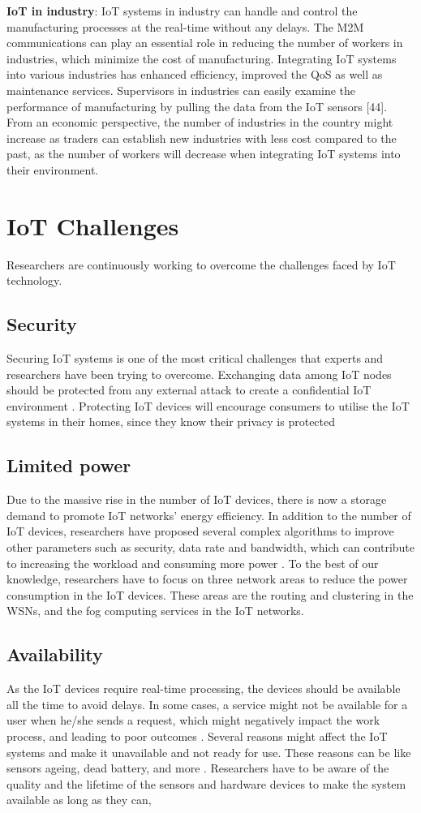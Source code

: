 \documentclass[pmlr,twocolumn,10pt]{jmlr} %
\begin{document}
\textbf{IoT in industry}: IoT systems in industry can handle and 
control the manufacturing processes at the real-time without 
any delays. The M2M communications can play an essential 
role in reducing the number of workers in industries, which 
minimize the cost of manufacturing. Integrating IoT 
systems into various industries has enhanced efficiency, 
improved the QoS as well as maintenance services. 
Supervisors in industries can easily examine the 
performance of manufacturing by pulling the data from the 
IoT sensors [44]. From an economic perspective, the 
number of industries in the country might increase as traders 
can establish new industries with less cost compared to the 
past, as the number of workers will decrease when 
integrating IoT systems into their environment.


\section{IoT Challenges}
Researchers are continuously working to overcome the 
challenges faced by IoT technology.
\subsection{Security }
 Securing IoT systems is one of the most critical 
challenges that experts and researchers have been trying to 
overcome. Exchanging data among IoT nodes should be 
protected from any external attack to create a confidential 
IoT environment . Protecting IoT devices will 
encourage consumers to utilise the IoT systems in their 
homes, since they know their privacy is protected


\subsection{Limited power  }
Due to the massive rise in the number of 
IoT devices, there is now a storage demand to promote IoT 
networks' energy efficiency. In addition to the number of 
IoT devices, researchers have proposed several complex 
algorithms to improve other parameters such as security, 
data rate and bandwidth, which can contribute to increasing 
the workload and consuming more power . To the best 
of our knowledge, researchers have to focus on three 
network areas to reduce the power consumption in the IoT 
devices. These areas are the routing and clustering in the 
WSNs, and the fog computing services in the IoT networks.


\subsection{ Availability }
As the IoT devices require real-time processing, the devices 
should be available all the time to avoid delays. In some 
cases, a service might not be available for a user when 
he/she sends a request, which might negatively impact the 
work process, and leading to poor outcomes . Several 
reasons might affect the IoT systems and make it 
unavailable and not ready for use. These reasons can be like 
sensors ageing, dead battery, and more . Researchers 
have to be aware of the quality and the lifetime of the 
sensors and hardware devices to make the system available 
as long as they can,
\end{document}

